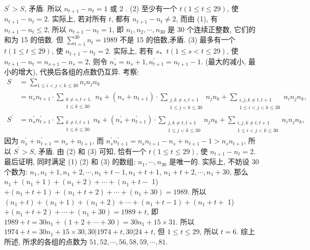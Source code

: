 $S^{\prime}>S$, 矛盾.
所以 $n_{t+1}-n_t=1$ 或 2 .
(2) 至少有一个 $t(1 \leqslant t \leqslant 29)$, 使 $n_{t+1}-n_t=2$.
实际上, 若对所有 $t$, 都有 $n_{t+1}-n_t \neq 2$, 而由 (1), 有 $n_{t+1}-n_t \leqslant 2$, 所以 $n_{t+1}-n_t=1$, 即 $n_1, n_2, \cdots, n_{30}$ 是 30 个连续正整数, 它们的和为 15 的倍数.
但 $\sum_{t=1}^{30} n_t=1989$ 不是 15 的倍数,矛盾.
(3) 最多有一个 $t(1 \leqslant t \leqslant 29)$, 使 $n_{t+1}-n_t=2$.
实际上, 若有 $s 、 t(1 \leqslant s<t \leqslant 29)$, 使 $n_{t+1}-n_t=n_{s+1}-n_s=2$, 则令 $n_s^{\prime}= n_s+1, n_{t+1}^{\prime}=n_{t+1}-1$. (最大的减小, 最小的增大), 代换后各组的点数仍互异.
考察:
$$
\begin{aligned}
S & =\sum_{1 \leqslant i<j<k \leqslant 30} n_i n_j n_k \\
& =n_s n_{t+1} \cdot \sum_{\substack{k \neq s, t+1 . \\
1 \leqslant k \leqslant 30}} n_k+\left(n_s+n_{t+1}\right) \cdot \sum_{\substack{j, k \neq s, t+1 \\
1 \leqslant j<k \leqslant 30}} n_j n_k+\sum_{\substack{i, j, k \neq t, t+1 \\
1 \leqslant i<j<k \leqslant 30}} n_i n_j n_k, \\
S^{\prime} & =n_s^{\prime} n_{t+1}^{\prime} \cdot \sum_{\substack{k \neq t, t+1 \\
1 \leqslant k \leqslant 30}} n_k+\left(n_s^{\prime}+n_{t+1}^{\prime}\right) \cdot \sum_{\substack{j, k \neq t, t+1 \\
1 \leqslant j<k \leqslant 30}} n_j n_k+\sum_{\substack{i, j, k \neq t, t+1 \\
1 \leqslant i<j<k \leqslant 30}} n_i n_j n_k,
\end{aligned}
$$
因为 $n_s^{\prime}+n_{t+1}^{\prime}=n_s+n_{t+1}$, 而 $n_s^{\prime} n_{t+1}^{\prime}=n_s n_{t+1}-n_s+n_{t+1}-1>n_s n_{t+1}$, 所以 $S^{\prime}>S$, 矛盾.
由 (2) 和 (3) 可知, 恰有一个 $t(1 \leqslant t \leqslant 29)$, 使 $n_{t+1}-n_t=2$.
最后证明, 同时满足 (1) (2) 和 (3) 的数组: $n_1, \cdots, n_{30}$ 是唯一的.
实际上, 不妨设 30 个数为: $n_1, n_1+1, n_1+2, \cdots, n_1+t-1, n_1+t+1$, $n_1+t+2, \cdots, n_1+30$, 那么 $n_1+\left(n_1+1\right)+\left(n_1+2\right)+\cdots+\left(n_1+t-\right.$ 1) $+\left(n_1+t+1\right)+\left(n_1+t+2\right)+\cdots+\left(n_1+30\right)=1989$.
所以 $\left(n_1+t\right)+\left(n_1+1\right)+\left(n_1+2\right)+\cdots+\left(n_1+t-1\right)+\left(n_1+t+\right.$ 1) $+\left(n_1+t+2\right)+\cdots+\left(n_1+30\right)=1989+t$, 即 $1989+t=30 n_1+(1+ 2+\cdots+30)=30 n_1+15 \times 31$.
所以 $1974+t=30 n_1+15 \times 30,30|1974+t, 30| 24+t$, 但 $1 \leqslant t \leqslant 29$, 所以 $t=6$.
综上所述, 所求的各组的点数为 $51,52, \cdots, 56,58,59, \cdots, 81$.



